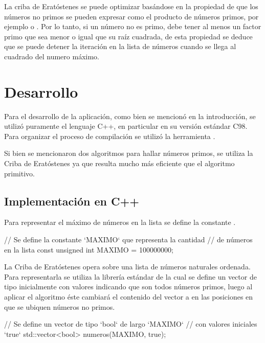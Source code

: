 \documentclass[12pt]{article}
\newenvironment{fullgrayverb}
{\verbbox}
{\endverbbox\par\colorbox{gray!25}{\parbox{\textwidth}{\theverbbox}}\par}
\begin{document}
La criba de Eratóstenes se puede optimizar basándose en la propiedad de que los
números no primos se pueden expresar como el producto de números primos, por
ejemplo  o . Por lo tanto, si un número no es
primo, debe tener al menos un factor primo que sea menor o igual que su raíz
cuadrada, de esta propiedad se deduce que se puede detener la iteración en la
lista de números cuando se llega al cuadrado del numero máximo.

\section{Desarrollo}

Para el desarrollo de la aplicación, como bien se mencionó en la introducción,
se utilizó puramente el lenguaje C++, en particular en su versión estándar C98.
Para organizar el proceso de compilación se utilizó la herramienta .

Si bien se mencionaron dos algoritmos para hallar números primos, se utiliza
la Criba de Eratóstenes ya que resulta mucho más eficiente que el algoritmo
primitivo.

\subsection{Implementación en C++}

Para representar el máximo de números en la lista se define la constante
.

\begin{fullgrayverb}[\mbox{}]
// Se define la constante `MAXIMO` que representa la cantidad
// de números en la lista
const unsigned int MAXIMO = 100000000;
\end{fullgrayverb}

La Criba de Eratóstenes opera sobre una lista de números naturales ordenada.
Para representarla se utiliza la librería estándar  de la cual
se define un vector de tipo  inicialmente con valores 
indicando que son todos números primos, luego al aplicar el algoritmo éste
cambiará el contenido del vector a  en las posiciones en que se
ubiquen números no primos.

\begin{fullgrayverb}[\mbox{}]
// Se define un vector de tipo `bool` de largo `MAXIMO`
// con valores iniciales `true`
std::vector<bool> numeros(MAXIMO, true);
\end{fullgrayverb}
\end{document}
